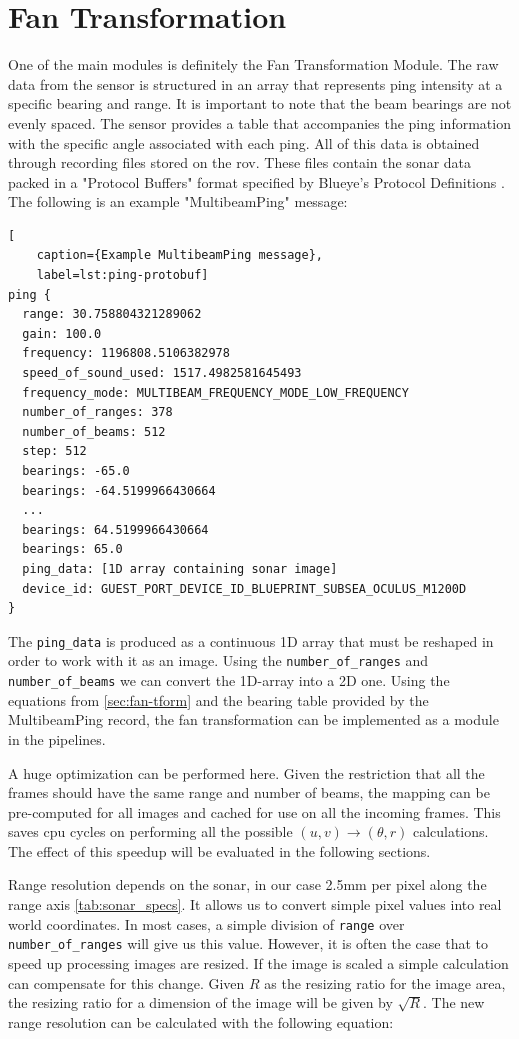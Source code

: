 \section{Fan Transformation}
One of the main modules is definitely the Fan Transformation Module. The raw data from the sensor is structured in an array that represents ping intensity at a specific bearing and range. It is important to note that the beam bearings are not evenly spaced. The sensor provides a table that accompanies the ping information with the specific angle associated with each ping. All of this data is obtained through recording files stored on the \acrshort{rov}. These files contain the sonar data packed in a "Protocol Buffers" format specified by Blueye's Protocol Definitions \cite{Blueye:ProtocolDefinitions}. The following is an example "MultibeamPing" message:

\begin{lstlisting}[
    caption={Example MultibeamPing message},
    label=lst:ping-protobuf]
ping {
  range: 30.758804321289062
  gain: 100.0
  frequency: 1196808.5106382978
  speed_of_sound_used: 1517.4982581645493
  frequency_mode: MULTIBEAM_FREQUENCY_MODE_LOW_FREQUENCY
  number_of_ranges: 378
  number_of_beams: 512
  step: 512
  bearings: -65.0
  bearings: -64.5199966430664
  ...
  bearings: 64.5199966430664
  bearings: 65.0
  ping_data: [1D array containing sonar image]
  device_id: GUEST_PORT_DEVICE_ID_BLUEPRINT_SUBSEA_OCULUS_M1200D
}
\end{lstlisting}

The \lstinline{ping_data} is produced as a continuous 1D array that must be reshaped in order to work with it as an image. Using the \lstinline{number_of_ranges} and \lstinline{number_of_beams} we can convert the 1D-array into a 2D one. Using the equations from \ref{sec:fan-tform} and the bearing table provided by the MultibeamPing record, the fan transformation can be implemented as a module in the pipelines. 

A huge optimization can be performed here. Given the restriction that all the frames should have the same range and number of beams, the mapping can be pre-computed for all images and cached for use on all the incoming frames. This saves cpu cycles on performing all the possible \((u, v) \rightarrow (\theta,r)\) calculations. The effect of this speedup will be evaluated in the following sections.

Range resolution depends on the sonar, in our case 2.5mm per pixel along the range axis \ref{tab:sonar_specs}. It allows us to convert simple pixel values into real world coordinates. In most cases, a simple division of \lstinline{range} over \lstinline{number_of_ranges} will give us this value. However, it is often the case that to speed up processing images are resized. If the image is scaled a simple calculation can compensate for this change. Given \(R\) as the resizing ratio for the image area, the resizing ratio for a dimension of the image will be given by \(\sqrt{R}\). The new range resolution can be calculated with the following equation:

